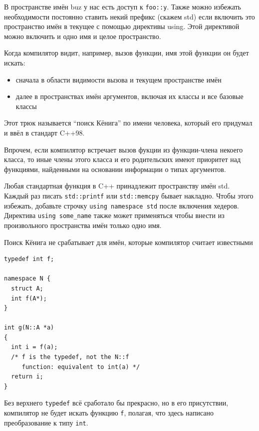 \documentclass[a4paper,12pt,oneside]{article}
\begin{document}
В пространстве имён buz у нас есть доступ к \lstinline!foo::y!. Также можно избежать необходимости постоянно ставить некий префикс (скажем std) если включить это пространство имён в текущее с помощью директивы using. Этой директивой можно включить и одно имя и целое пространство.

Когда компилятор видит, например, вызов функции, имя этой функции он будет искать:
\begin{itemize}
\item
сначала в области видимости вызова и текущем пространстве имён
\item
далее в пространствах имён аргументов, включая их классы и все базовые классы
\end{itemize}

Этот трюк называется ``поиск Кёнига'' по имени человека, который его придумал и ввёл в стандарт C++98.



Впрочем, если компилятор встречает вызов фукции из функции-члена некоего класса, то иные члены этого класса и его родительских имеют приоритет над функциями, найденными на основании информации о типах аргументов.

Любая стандартная функция в C++ принадлежит пространству имён std. Каждый раз писать \lstinline!std::printf! или \lstinline!std::memcpy! бывает накладно. Чтобы этого избежать, добавьте строчку \lstinline!using namespace std! после включения хедеров. Директива \lstinline!using some_name! также может применяться чтобы внести из произвольного пространства имён только одно имя.



Поиск Кёнига не срабатывает для имён, которые компилятор считает известными

\begin{lstlisting}
typedef int f;

namespace N {
  struct A;
  int f(A*);
}

int g(N::A *a)
{
  int i = f(a);
  /* f is the typedef, not the N::f
     function: equivalent to int(a) */
  return i;
}
\end{lstlisting}

Без верхнего \lstinline!typedef! всё сработало бы прекрасно, но в его присутствии, компилятор не будет искать функцию \lstinline!f!, полагая, что здесь написано преобразование к типу \lstinline!int!.
\end{document}
